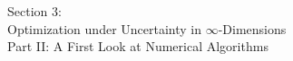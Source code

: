 \documentclass[aspectratio=169,xcolor=dvipsnames,10pt]{beamer}
\begin{document}

\begin{frame}\frametitle{}
\begin{center}\Large
Section 3: \\
Optimization under Uncertainty in $\infty$-Dimensions \\
Part II: A First Look at Numerical Algorithms
\end{center}
\end{frame}

\end{document}
